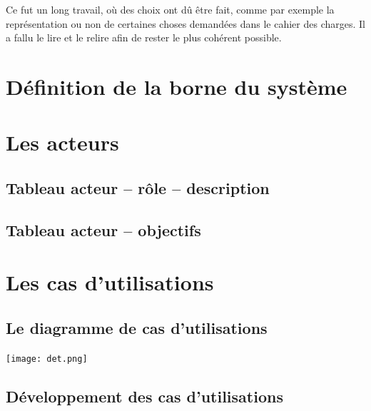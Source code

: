 \documentclass[11pt,a4paper]{article}
\begin{document}
Ce fut un long travail, où des choix ont dû être fait, 
comme par exemple la représentation ou non de certaines 
choses demandées dans le cahier des charges. Il a fallu 
le lire et le relire afin de rester le 
plus cohérent possible.

\newpage


\section{Définition de la borne du système}


\newpage


\section{Les acteurs}

\subsection{Tableau acteur -- r\^ole -- description}



\subsection{Tableau acteur -- objectifs}

\newpage


\section{Les cas d’utilisations}

\subsection{Le diagramme de cas d’utilisations}

\vspace{4cm}

\texttt{[image: det.png]}

\newpage

\subsection{Développement des cas d’utilisations}


\newpage
\end{document}
